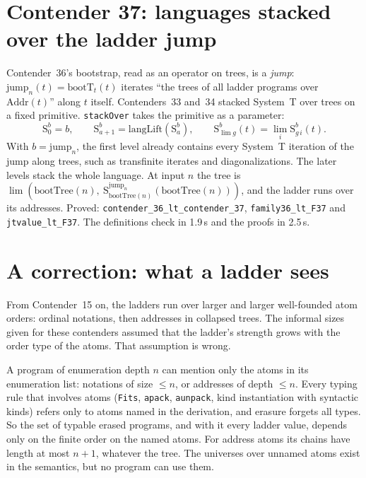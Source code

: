 \documentclass[11pt]{article}
\theoremstyle{definition}
\theoremstyle{remark}
\newcommand{\lean}[1]{\texttt{#1}}
\begin{document}
\section{Contender 37: languages stacked over the ladder jump}

Contender~36's bootstrap, read as an operator on trees, is a \emph{jump}:
$\mathrm{jump}_n(t)=\mathrm{bootT}_t(t)$ iterates ``the trees of all ladder
programs over $\mathrm{Addr}(t)$'' along $t$ itself. Contenders~33 and~34
stacked System~T over trees on a fixed primitive. \lean{stackOver} takes the
primitive as a parameter:
\[
\mathrm{S}^b_0=b,\qquad \mathrm{S}^b_{a+1}=\mathrm{langLift}(\mathrm{S}^b_a),\qquad
\mathrm{S}^b_{\lim g}(t)=\lim_i \mathrm{S}^b_{g\,i}(t).
\]
With $b=\mathrm{jump}_n$, the first level already contains every System~T
iteration of the jump along trees, such as transfinite iterates and
diagonalizations. The later levels stack the whole language. At input $n$ the
tree is $\lim(\mathrm{bootTree}(n),\ \mathrm{S}^{\mathrm{jump}_n}_{\mathrm{bootTree}(n)}(\mathrm{bootTree}(n)))$,
and the ladder runs over its addresses. Proved:
\lean{contender\_36\_lt\_\allowbreak contender\_37}, \lean{family36\_lt\_F37} and
\lean{jtvalue\_lt\_F37}. The definitions check in 1.9\,s and the proofs in 2.5\,s.

\section{A correction: what a ladder sees}\label{sec:truncation}

From Contender~15 on, the ladders run over larger and larger well-founded
atom orders: ordinal notations, then addresses in collapsed trees. The
informal sizes given for these contenders assumed that the ladder's strength
grows with the order type of the atoms. That assumption is wrong.

A program of enumeration depth $n$ can mention only the atoms in its
enumeration list: notations of size $\le n$, or addresses of depth $\le n$.
Every typing rule that involves atoms (\lean{Fits}, \lean{apack},
\lean{aunpack}, kind instantiation with syntactic kinds) refers only to atoms
named in the derivation, and erasure forgets all types. So the set of typable
erased programs, and with it every ladder value, depends only on the finite
order on the named atoms. For address atoms its chains have length at most
$n+1$, whatever the tree. The universes over unnamed atoms exist in the
semantics, but no program can use them.
\end{document}
